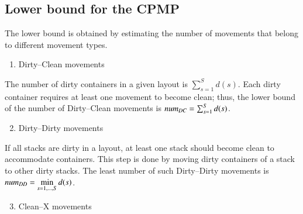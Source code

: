 \documentclass[review,3p,times,authoryear,12pt]{elsarticle}
\begin{document}
%
%


\subsection{Lower bound for the CPMP}

The lower bound is obtained by estimating the number of movements that belong to different movement types.
\begin{enumerate}
\setcounter{enumi}{0}
\item Dirty--Clean movements
\end{enumerate}

The number of dirty containers in a given layout is $\sum_{s=1}^S d(s)$. Each dirty container requires at least one movement to become clean; thus, the lower bound of the number of Dirty--Clean movements is $\id{num}_\id{DC}=\sum_{s=1}^S d(s)$.

\begin{enumerate}
\setcounter{enumi}{1}
\item Dirty--Dirty movements
\end{enumerate}

If all stacks are dirty in a layout, at least one stack should become clean to accommodate containers. This step is done by moving dirty containers of a stack to other dirty stacks. The least number of such Dirty--Dirty movements is $\id{num}_\id{DD} = \min\limits_{s=1, \dots, S} d(s)$.

\begin{enumerate}
\setcounter{enumi}{2}
\item Clean--X movements
\end{enumerate}
\end{document}
